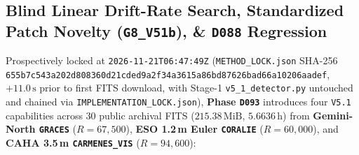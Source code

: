 \documentclass[twocolumn,10pt]{article}
\begin{document}
\subsection{Blind Linear Drift-Rate Search, Standardized Patch Novelty (\texttt{G8\_V51b}), \& \texttt{D088} Regression}
Prospectively locked at \texttt{2026-11-21T06:47:49Z} (\texttt{METHOD\_LOCK.json} SHA-256 \texttt{655b7c54\allowbreak 3a202d80\allowbreak 8360d21c\allowbreak ded9a2f3\allowbreak 4a3615a8\allowbreak 6bd87626\allowbreak bad66a10\allowbreak 206aadef}, $+11.0\,\text{s}$ prior to first FITS download, with Stage-1 \texttt{v5\_1\_detector.py} untouched and chained via \texttt{IMPLEMENTATION\_LOCK.json}), \textbf{Phase \texttt{D093}} introduces four \texttt{V5.1} capabilities across $30$ public archival FITS ($215.38\,\text{MiB}$, $5.6636\,\text{h}$) from \textbf{Gemini-North \texttt{GRACES}} ($R=67{,}500$), \textbf{ESO 1.2\,m Euler \texttt{CORALIE}} ($R=60{,}000$), and \textbf{CAHA 3.5\,m \texttt{CARMENES\_VIS}} ($R=94{,}600$):
\end{document}
